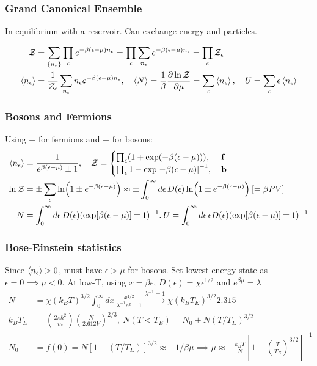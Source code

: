 \documentclass[a4paper, english, 12pt]{article}
\newcommand{\eps}{\epsilon}
\newcommand{\closed}[1]{\left( #1 \right)}
\newcommand{\bracket}[1]{\left[ #1 \right]}
\begin{document}
\begin{multicols*}{2}
\subsubsection*{\scriptsize Grand Canonical Ensemble}
In equilibrium with a reservoir. Can exchange energy and particles. 

\begin{align*}
    \mathcal{Z} &= \sum_{\{n_\epsilon\}} \prod_\epsilon e^{-\beta(\epsilon-\mu)n_\epsilon} = \prod_\epsilon \sum_{n_\epsilon} e^{-\beta(\epsilon-\mu)n_\epsilon} = \prod_\epsilon \mathcal{Z}_\epsilon \\
    \expval{n_\epsilon} &= \frac{1}{\mathcal{Z}_\epsilon} \sum_{n_\epsilon} n_\epsilon e^{-\beta(\epsilon-\mu)n_\epsilon},\quad \expval{N} =\frac{1}{\beta}\pdv{\ln\mathcal{Z}}{\mu} = \sum_\epsilon \expval{n_\epsilon},\quad U = \sum_\eps \eps \expval{n_\eps}
\end{align*} 



\subsubsection*{\scriptsize Bosons and Fermions}
Using $+$ for fermions and $-$ for bosons: 
\begin{align*}
    \expval{n_\eps} &= \frac{1}{e^{\beta(\eps-\mu)} \pm 1},\quad \mathcal{Z} = \begin{cases}
        \prod_\eps (1+\exp(-\beta(\eps-\mu))),\:&\textbf{f} \\ 
        \prod_\eps {1-\exp[-\beta(\eps-\mu)]}^{-1},\:&\textbf{b}
    \end{cases} \\
    \ln \mathcal{Z} &= \pm \sum_\eps \ln(1 \pm e^{-\beta(\eps-\mu)}) \approx \pm \int_0^\infty d\eps\, D(\eps) \ln(1 \pm e^{-\beta(\eps-\mu)})\:[=\beta PV] \\
    N &= \int_0^\infty d\eps\,D(\eps) (\exp[\beta(\eps-\mu)]\pm1)^{-1}.\:U = \int_0^\infty d\eps\, \eps D(\eps) (\exp[\beta(\eps-\mu)]\pm1)^{-1} 
\end{align*}



\subsubsection*{\scriptsize Bose-Einstein statistics}
Since $\expval{n_\eps}>0$, must have $\eps>\mu$ for bosons. Set lowest energy state as $\eps=0\implies\mu<0$. At low-T, using $x=\beta\eps$, $D(\eps)=\chi \eps^{1/2}$ and $e^{\beta\mu}=\lambda$ 
\begin{align*}
    N &= \chi (k_B T)^{3/2} \int_0^\infty dx\, \frac{x^{1/2}}{\lambda^{-1} e^x - 1} \xrightarrow{\lambda^{-1}=1} \chi (k_B T_E)^{3/2} 2.315 \\
    k_B T_E &= \left( \frac{2\pi\hbar^2}{m}\right) \left( \frac{N}{2.612V} \right)^{2/3},\: N(T<T_E)=N_0+N(T/T_E)^{3/2}  \\
    N_0 &=f(0) = N[1-(T/T_E)]^{3/2}\approx -1/\beta\mu \implies \mu \approx -\frac{k_B T}{N}\bracket{1-\closed{\frac{T}{T_E}}^{3/2}}^{-1}
\end{align*}


\end{multicols*}
\end{document}
